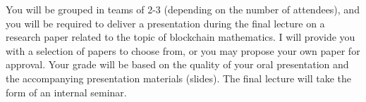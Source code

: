 \documentclass[11pt]{article}
\begin{document}
You will be grouped in teams of 2-3 (depending on the number of attendees), and you will be required to deliver a presentation during the final lecture on a research paper related to the topic of blockchain mathematics. I will provide you with a selection of papers to choose from, or you may propose your own paper for approval. Your grade will be based on the quality of your oral presentation and the accompanying presentation materials (slides). The final lecture will take the form of an internal seminar.

\nocite{*}



\end{document}
